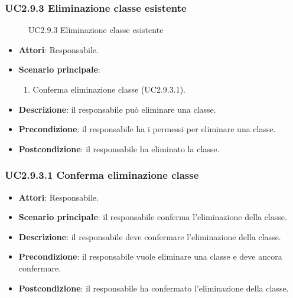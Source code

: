 \subsubsection{UC2.9.3 Eliminazione classe esistente}
\begin{figure}[H]
\centering
\noindent{}
\caption{UC2.9.3 Eliminazione classe esistente}
\end{figure}
\begin{itemize}
\item \textbf{Attori}: Responsabile.
\item \textbf{Scenario principale}:
\begin{enumerate}
\item Conferma eliminazione classe (UC2.9.3.1).
\end{enumerate}
\item \textbf{Descrizione}: il responsabile può eliminare una classe.
\item \textbf{Precondizione}: il responsabile ha i permessi per eliminare una classe.
\item \textbf{Postcondizione}: il responsabile ha eliminato la classe.
\end{itemize}
\subsubsection{UC2.9.3.1 Conferma eliminazione classe}
\begin{itemize}
\item \textbf{Attori}: Responsabile.
\item \textbf{Scenario principale}: il responsabile conferma l'eliminazione della classe.
\item \textbf{Descrizione}: il responsabile deve confermare l'eliminazione della classe.
\item \textbf{Precondizione}: il responsabile vuole eliminare una classe e deve ancora confermare.
\item \textbf{Postcondizione}: il responsabile ha confermato l'eliminazione della classe.
\end{itemize}
